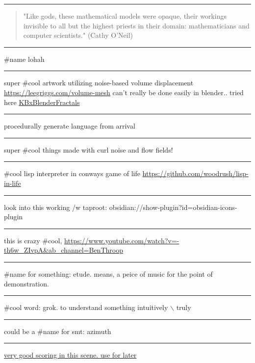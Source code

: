 \documentclass[letterpaper]{article}
\begin{document}
\noindent\rule{\textwidth}{0.5pt}

\begin{quote}
"Like gods, these mathematical models were opaque, their workings
invisible to all but the highest priests in their domain:
mathematicians and computer scientists." (Cathy O'Neil)
\end{quote}

\noindent\rule{\textwidth}{0.5pt}

\#name lohah

\noindent\rule{\textwidth}{0.5pt}

super \#cool artwork utilizing noise-based volume displacement
\url{https://leegriggs.com/volume-mesh} can't really be done easily in
blender.. tried here \href{KBxBlenderFractals.org}{KBxBlenderFractals}

\noindent\rule{\textwidth}{0.5pt}

procedurally generate language from arrival

\noindent\rule{\textwidth}{0.5pt}

super \#cool things made with curl noise and flow fields!

\noindent\rule{\textwidth}{0.5pt}

\#cool lisp interpreter in conways game of life
\url{https://github.com/woodrush/lisp-in-life}

\noindent\rule{\textwidth}{0.5pt}

look into this working /w taproot:
obsidian://show-plugin?id=obsidian-icons-plugin

\noindent\rule{\textwidth}{0.5pt}

this is crazy \#cool,
\url{https://www.youtube.com/watch?v=-th6w\_ZIvpA\&ab\_channel=BenThroop}

\noindent\rule{\textwidth}{0.5pt}

\#name for something: etude. means, a peice of music for the point of
demonstration.

\noindent\rule{\textwidth}{0.5pt}

\#cool word: grok. to understand something intuitively $\backslash$ truly

\noindent\rule{\textwidth}{0.5pt}

could be a \#name for smt: azimuth

\noindent\rule{\textwidth}{0.5pt}

\href{https://www.youtube.com/watch?v=uvap4gEOC5I\&ab\_channel=SonyPicturesHomeEntertainment}{very
good scoring in this scene. use for later}
\end{document}
